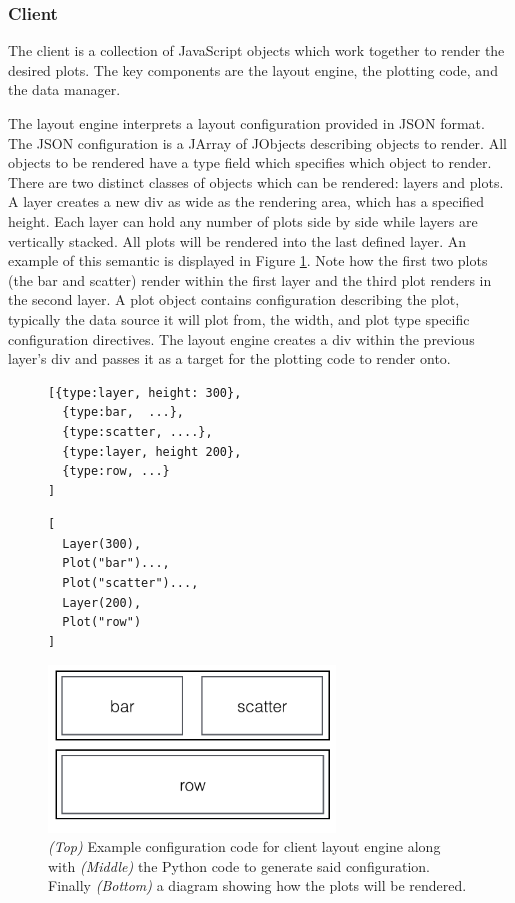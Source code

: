 \documentclass[letter,twocolumn]{article}
\begin{document}
\subsubsection{Client}\label{sec:client}

The client is a collection of JavaScript objects which work together to render the desired plots.
The key components are the layout engine,  the plotting code, and the data manager.

The layout engine interprets a layout configuration provided in JSON format.
The JSON configuration is a JArray of JObjects describing objects to render.
All objects to be rendered have a type field which specifies which object to render.
There are two distinct classes of objects which can be rendered: layers and plots.
A layer creates a new div as wide as the rendering area, which has a specified height.
Each layer can hold any number of plots side by side while layers are vertically stacked.
All plots will be rendered into the last defined layer.
An example of this semantic is displayed in Figure \ref{fig:layout}.
Note how the first two plots (the bar and scatter) render within the first layer and the third plot renders in the second layer.
A plot object contains configuration describing the plot, typically the data source it will plot from, the width, and plot type specific configuration directives.
The layout engine creates a div within the previous layer's div and passes it as a target for the plotting code to render onto.

\begin{figure}
\begin{lstlisting}
[{type:layer, height: 300}, 
  {type:bar,  ...},
  {type:scatter, ....},
  {type:layer, height 200},
  {type:row, ...}
]
\end{lstlisting}

\begin{lstlisting}
[
  Layer(300), 
  Plot("bar")..., 
  Plot("scatter")...,
  Layer(200), 
  Plot("row")
]
\end{lstlisting}
\includegraphics[width=3in]{figs/layout_example.png}
\caption{\emph{(Top)} Example configuration code for client layout engine along with \emph{(Middle)} the Python code to generate said configuration.  Finally \emph{(Bottom)} a diagram showing how the plots will be rendered.}\label{fig:layout}
\end{figure}
\end{document}
